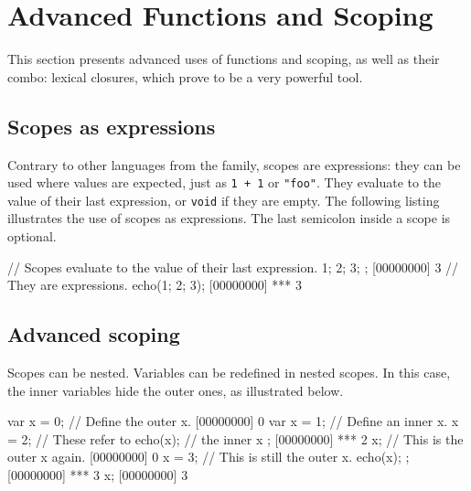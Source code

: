 
\chapter{Advanced Functions and Scoping}
\label{sec:tut:function}

This section presents advanced uses of functions and scoping, as well as
their combo: lexical closures, which prove to be a very powerful tool.

\section{Scopes as expressions}

Contrary to other languages from the \C family, scopes are expressions: they
can be used where values are expected, just as \lstinline|1 + 1| or
\lstinline|"foo"|.  They evaluate to the value of their last expression, or
\lstinline|void| if they are empty. The following listing illustrates the
use of scopes as expressions. The last semicolon inside a scope is optional.

\begin{urbiscript}[firstnumber=1]
// Scopes evaluate to the value of their last expression.
{ 1; 2; 3; };
[00000000] 3
// They are expressions.
echo({1; 2; 3});
[00000000] *** 3
\end{urbiscript}

\section{Advanced scoping}

Scopes can be nested. Variables can be redefined in nested scopes. In this
case, the inner variables hide the outer ones, as illustrated below.

\begin{urbiscript}
var x = 0;   // Define the outer x.
[00000000] 0
{
  var x = 1; // Define an inner x.
  x = 2;     // These refer to
  echo(x);   // the inner x
};
[00000000] *** 2
x;           // This is the outer x again.
[00000000] 0
{
  x = 3;     // This is still the outer x.
  echo(x);
};
[00000000] *** 3
x;
[00000000] 3
\end{urbiscript}

